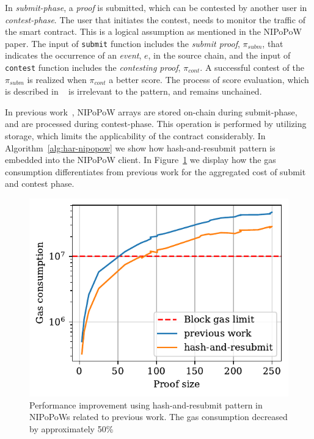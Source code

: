 In \emph{submit-phase}, a \emph{proof} is submitted, which can be contested by
another user in \emph{contest-phase}.  The user that initiates the contest,
needs to monitor the traffic of the smart contract. This is a logical
assumption as mentioned in the NIPoPoW paper. The input of \texttt{submit}
function includes the \emph{submit proof}, $\pi_{subm}$, that indicates the
occurrence of an \emph{event}, $e$, in the source chain, and the input of
\texttt{contest} function includes the \emph{contesting proof}, $\pi_{cont}$. A
successful contest of the $\pi_{subm}$ is realized when $\pi_{cont}$ a
better score. The process of score evaluation, which is described in
~\cite{nipopows} is irrelevant to the pattern, and remains unchained.

In previous work~\cite{gglou}, NIPoPoW arrays are stored on-chain during
submit-phase, and are processed during contest-phase. This operation is
performed by utilizing storage, which limits the applicability of the contract
considerably. In Algorithm~\ref{alg:har-nipopow} we show how hash-and-resubmit
pattern is embedded into the NIPoPoW client. In Figure~\ref{fig:har-nipopow} we
display how the gas consumption differentiates from previous work for the
aggregated cost of submit and contest phase.




\begin{figure}[h]
    \begin{center}
        \includegraphics[width=1\columnwidth]{figures/har-nipopows.pdf}
    \end{center}
    \caption{Performance improvement using hash-and-resubmit pattern in
    NIPoPoWs related to previous work. The gas consumption decreased by
    approximately 50\%}
    \label{fig:har-nipopow}
\end{figure}
